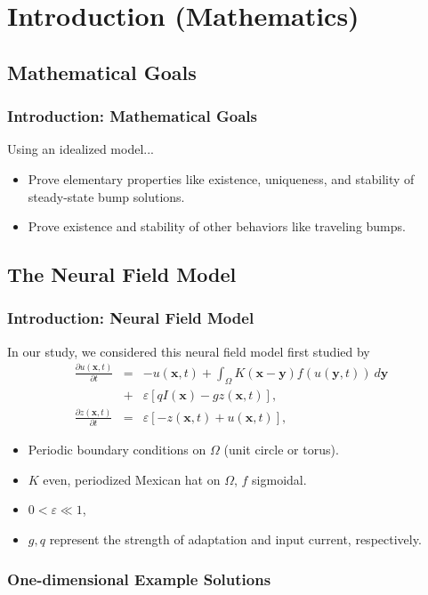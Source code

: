 \documentclass{beamer}
\newcommand{\x}{\mathbf{x}}
\newcommand{\y}{\mathbf{y}}
\newcommand{\io}{\int_\Omega}
\newcommand{\ve}{\varepsilon}
\begin{document}
\section{Introduction (Mathematics)}

\subsection{Mathematical Goals}

\begin{frame}
 \frametitle{Introduction: Mathematical Goals}
 Using an idealized model...
 \begin{itemize}
 \item Prove elementary properties like existence, uniqueness, and stability of steady-state bump solutions.
 \item Prove existence and stability of other behaviors like traveling bumps.
 \end{itemize}
\end{frame}


\subsection{The Neural Field Model}

\begin{frame}
\frametitle{Introduction: Neural Field Model}
In our study, we considered this neural field model first studied by \cite{pinto_ermentrout_2001_siam}
\begin{eqnarray*}
\label{eq:u1}
\frac{\partial u(\x,t)}{\partial t} &=& -u(\x,t) + \io K(\x-\y) f(u(\y,t))\ d\y  \\
{} &+& \ve[q I(\x) - g z(\x,t)] \nonumber, \\
\label{eq:z1}
\frac{\partial z(\x,t)}{\partial t} &=& \ve [-z(\x,t)+u(\x,t)],
\end{eqnarray*}
\begin{itemize}
 \item<1-> Periodic boundary conditions on $\Omega$ (unit circle or torus).
 \item<2-> $K$ even, periodized Mexican hat on $\Omega$, $f$ sigmoidal.
 \item<3-> $0 < \varepsilon \ll 1$, 
 \item<4-> $g,q$ represent the strength of adaptation and input current, respectively.
\end{itemize}
\end{frame}


\begin{frame}
 \frametitle{One-dimensional Example Solutions}
\begin{center}
\end{center}
\end{frame}
\end{document}
